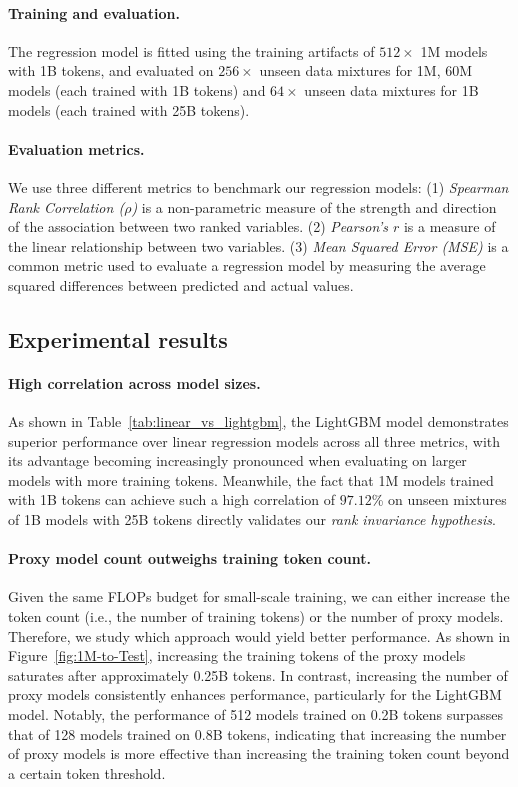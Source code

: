 \paragraph{Training and evaluation.}
The regression model is fitted using the training artifacts of $512 \times$ 1M models with 1B tokens, and evaluated on $256 \times$ unseen data mixtures for 1M, 60M models (each trained with 1B tokens) and $64 \times$ unseen data mixtures for 1B models (each trained with 25B tokens).

\paragraph{Evaluation metrics.}
We use three different metrics to benchmark our regression models: (1) \textit{Spearman Rank Correlation ($\rho$)} is a non-parametric measure of the strength and direction of the association between two ranked variables. (2) \textit{Pearson's $r$} is a measure of the linear relationship between two variables. (3) \textit{Mean Squared Error (MSE)} is a common metric used to evaluate a regression model by measuring the average squared differences between predicted and actual values. 

\subsection{Experimental results}\label{sec:regression_results}


\paragraph{High correlation across model sizes.}
As shown in Table~\ref{tab:linear_vs_lightgbm}, the LightGBM model demonstrates superior performance over linear regression models across all three metrics, with its advantage becoming increasingly pronounced when evaluating on larger models with more training tokens.
Meanwhile, the fact that 1M models trained with 1B tokens can achieve such a high correlation of $97.12$\% on unseen mixtures of 1B models with 25B tokens directly validates our \textit{rank invariance hypothesis}. 


\paragraph{Proxy model count outweighs training token count.}
Given the same FLOPs budget for small-scale training, we can either increase the token count (i.e., the number of training tokens) or the number of proxy models. Therefore, we study which approach would yield better performance.
As shown in Figure~\ref{fig:1M-to-Test}, increasing the training tokens of the proxy models saturates after approximately 0.25B tokens.
In contrast, increasing the number of proxy models consistently enhances performance, particularly for the LightGBM model.
Notably, the performance of 512 models trained on 0.2B tokens surpasses that of 128 models trained on 0.8B tokens, indicating that increasing the number of proxy models is more effective than increasing the training token count beyond a certain token threshold. 